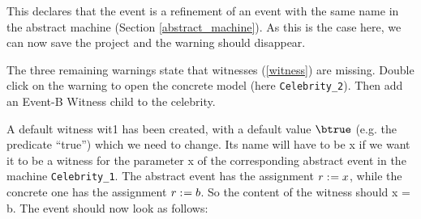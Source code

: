 
 This declares that the event is a refinement of an event with the same name in the abstract machine (Section \ref{abstract_machine}). As this is the case here, we can now save the project and the warning should disappear.


The three remaining warnings state that witnesses (\ref{witness}) are missing. Double click on the warning to open the concrete model (here \texttt{Celebrity\_2}). Then add an \textsf{Event-B Witness} child to the \textsf{celebrity}.

A default witness \textsf{wit1} has been created, with a default value \textsf{$\btrue$} (e.g. the predicate ``true'') which we need to change. Its name will have to be \textsf{x} if we want it to be a witness for the parameter \textsf{x} of the corresponding abstract event in the machine \texttt{Celebrity\_1}. The abstract event has the assignment \textsf{$r \mathrel{:\mkern1mu=} x$}, while the concrete one has the assignment \textsf{$r \mathrel{:\mkern1mu=} b$}. So the content of the witness should \textsf{x = b}. The event should now look as follows: 

\begin{description}
		\begin{description}
		\WhenGrd
			\begin{description}
			\end{description}
		\Witnesses
			\begin{description}
			\nItem{ x }{ x=b }
			\end{description}
		\ThenAct
			\begin{description}
			\nItemX{ act1 }{ r :=  b }
			\end{description}
		\EndAct
		\end{description}
\end{description}

